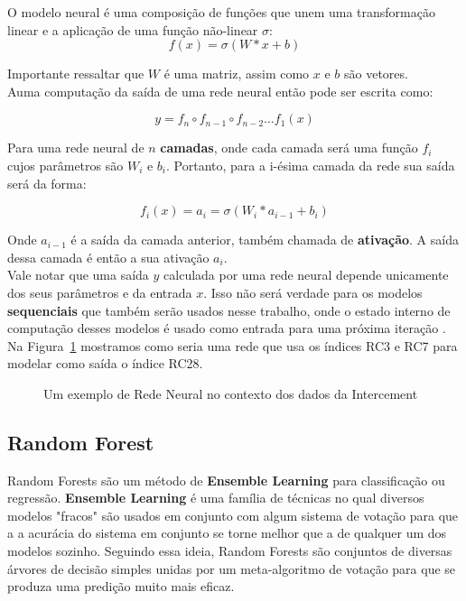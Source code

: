 O modelo neural é uma composição de funções que unem uma transformação linear e
a aplicação de uma função não-linear $\sigma$: \\

\[ f(x)=  \sigma(W*x + b) \]

Importante ressaltar que $W$ é uma matriz, assim como $x$ e $b$ são vetores. \\

Auma  computação da saída de uma rede neural então pode ser escrita como:

\[   y = f_n \circ f_{n-1} \circ f_{n-2} \dots f_1(x)  \]

Para uma rede neural de $n$ \textbf{camadas}, onde cada camada será uma função
$f_i$ cujos parâmetros são $W_i$ e $b_i$. Portanto, para a i-ésima camada da rede
sua saída será da forma: 

\[ f_i (x)=  a_i = \sigma(W_i*a_{i-1} + b_i) \]

Onde $a_{i-1}$ é a saída da camada anterior, também chamada de
\textbf{ativação}. A saída dessa camada é então a sua ativação $a_i$. \\ 

Vale notar que uma saída $y$ calculada por uma rede neural depende unicamente dos
seus parâmetros e da entrada $x$. Isso não será verdade para os modelos
\textbf{sequenciais} que também serão usados nesse trabalho, onde o estado
interno de computação desses modelos é usado como entrada para uma próxima
iteração \citep{dlbook}. \\

Na Figura~\ref{fig:nn} mostramos como seria uma rede que usa os índices RC3 e RC7 para
modelar como saída o índice RC28. \\  

\begin{figure}
  \centering
  
  \caption{Um exemplo de Rede Neural no contexto dos dados da Intercement}
  \label{fig:nn}
\end{figure}


\bigskip

 
\subsection{Random Forest}

Random Forests são um método de \textbf{Ensemble Learning} para classificação ou regressão. \textbf{Ensemble Learning} é uma família de técnicas no qual diversos modelos "fracos" são usados em conjunto com algum sistema de votação para que a a acurácia do sistema em conjunto se torne melhor que a de qualquer um dos modelos sozinho. Seguindo essa ideia, Random Forests são conjuntos de diversas árvores de decisão simples unidas por um meta-algoritmo de votação para que se produza uma predição muito mais eficaz.


